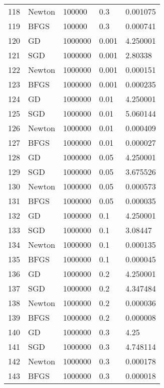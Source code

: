 \begin{tabular}{lllll}
118 &  Newton &   100000 &    0.3 &  0.001075 \\
119 &    BFGS &   100000 &    0.3 &  0.000741 \\
120 &      GD &  1000000 &  0.001 &  4.250001 \\
121 &     SGD &  1000000 &  0.001 &   2.80338 \\
122 &  Newton &  1000000 &  0.001 &  0.000151 \\
123 &    BFGS &  1000000 &  0.001 &  0.000235 \\
124 &      GD &  1000000 &   0.01 &  4.250001 \\
125 &     SGD &  1000000 &   0.01 &  5.060144 \\
126 &  Newton &  1000000 &   0.01 &  0.000409 \\
127 &    BFGS &  1000000 &   0.01 &  0.000027 \\
128 &      GD &  1000000 &   0.05 &  4.250001 \\
129 &     SGD &  1000000 &   0.05 &  3.675526 \\
130 &  Newton &  1000000 &   0.05 &  0.000573 \\
131 &    BFGS &  1000000 &   0.05 &  0.000035 \\
132 &      GD &  1000000 &    0.1 &  4.250001 \\
133 &     SGD &  1000000 &    0.1 &   3.08447 \\
134 &  Newton &  1000000 &    0.1 &  0.000135 \\
135 &    BFGS &  1000000 &    0.1 &  0.000045 \\
136 &      GD &  1000000 &    0.2 &  4.250001 \\
137 &     SGD &  1000000 &    0.2 &  4.347484 \\
138 &  Newton &  1000000 &    0.2 &  0.000036 \\
139 &    BFGS &  1000000 &    0.2 &  0.000008 \\
140 &      GD &  1000000 &    0.3 &      4.25 \\
141 &     SGD &  1000000 &    0.3 &  4.748114 \\
142 &  Newton &  1000000 &    0.3 &  0.000178 \\
143 &    BFGS &  1000000 &    0.3 &  0.000018 \\
\bottomrule
\end{tabular}
